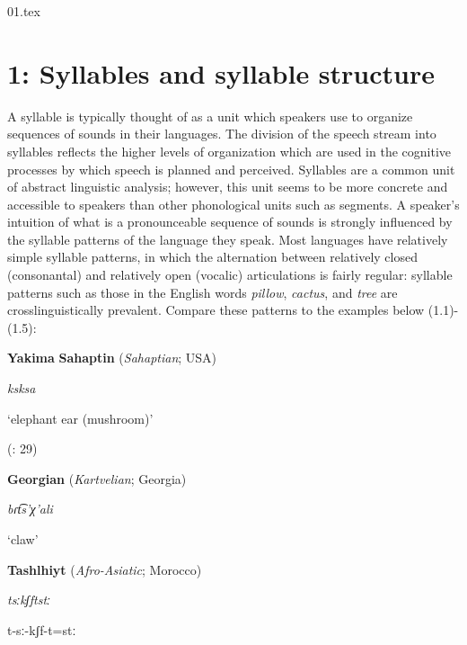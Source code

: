 01.tex
\chapter{1: Syllables and syllable structure}

  A syllable is typically thought of as a unit which speakers use to organize sequences of sounds in their languages. The division of the speech stream into syllables reflects the higher levels of organization which are used in the cognitive processes by which speech is planned and perceived. Syllables are a common unit of abstract linguistic analysis; however, this unit seems to be more concrete and accessible to speakers than other phonological units such as segments. A speaker’s intuition of what is a pronounceable sequence of sounds is strongly influenced by the syllable patterns of the language they speak. Most languages have relatively simple syllable patterns, in which the alternation between relatively closed (consonantal) and relatively open (vocalic) articulations is fairly regular: syllable patterns such as those in the English words \textit{pillow}, \textit{cactus}, and \textit{tree} are crosslinguistically prevalent. Compare these patterns to the examples below (1.1)-(1.5):



\ea\label{ex:(1.1)}
   \textbf{Yakima} \textbf{Sahaptin} (\textit{Sahaptian}; USA)



\textit{ksksa}



‘elephant ear (mushroom)’



(\citealt{HargusBeavert2006}: 29)
\z



\ea\label{ex:(1.2)}
   \textbf{Georgian} (\textit{Kartvelian}; Georgia)



\textit{bɾt͡s’χ’ali}



‘claw’



\citep[204]{Butskhrikidze2002}


\z

\ea\label{ex:(1.3)}
   \textbf{Tashlhiyt} (\textit{Afro-Asiatic}; Morocco)



\textit{tsːkʃftstː}



t{}-sː{}-kʃf{}-t=stː



